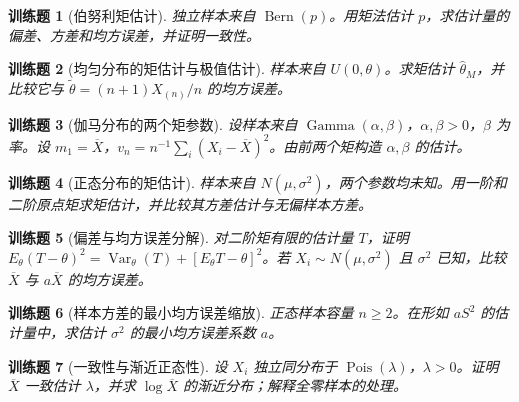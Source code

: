 \documentclass[UTF8,12pt,a4paper,fontset=fandol]{ctexbook}
\newtheorem{exercise}{训练题}[section]
\begin{document}
\begin{exercise}[伯努利矩估计]\label{q:B9.1}
独立样本来自 $\operatorname{Bern}(p)$。用矩法估计 $p$，求估计量的偏差、方差和均方误差，并证明一致性。\par{}\end{exercise}

\begin{exercise}[均匀分布的矩估计与极值估计]\label{q:B9.2}
样本来自 $U(0,\theta)$。求矩估计 $\widehat\theta_M$，并比较它与 $\widetilde\theta=(n+1)X_{(n)}/n$ 的均方误差。\par{}\end{exercise}

\begin{exercise}[伽马分布的两个矩参数]\label{q:B9.3}
设样本来自 $\operatorname{Gamma}(\alpha,\beta)$，$\alpha,\beta>0$，$\beta$ 为率。设 $m_1=\overline X$，$v_n=n^{-1}\sum_i(X_i-\overline X)^2$。由前两个矩构造 $\alpha,\beta$ 的估计。\par{}\end{exercise}

\begin{exercise}[正态分布的矩估计]\label{q:B9.4}
样本来自 $N(\mu,\sigma^2)$，两个参数均未知。用一阶和二阶原点矩求矩估计，并比较其方差估计与无偏样本方差。\par{}\end{exercise}

\begin{exercise}[偏差与均方误差分解]\label{q:B9.5}
对二阶矩有限的估计量 $T$，证明 $E_\theta(T-\theta)^2=\operatorname{Var}_\theta(T)+[E_\theta T-\theta]^2$。若 $X_i\sim N(\mu,\sigma^2)$ 且 $\sigma^2$ 已知，比较 $\overline X$ 与 $a\overline X$ 的均方误差。\par{}\end{exercise}

\begin{exercise}[样本方差的最小均方误差缩放]\label{q:B9.6}
正态样本容量 $n\ge2$。在形如 $aS^2$ 的估计量中，求估计 $\sigma^2$ 的最小均方误差系数 $a$。\par{}\end{exercise}

\begin{exercise}[一致性与渐近正态性]\label{q:B9.7}
设 $X_i$ 独立同分布于 $\operatorname{Pois}(\lambda)$，$\lambda>0$。证明 $\overline X$ 一致估计 $\lambda$，并求 $\log\overline X$ 的渐近分布；解释全零样本的处理。\par{}\end{exercise}
\end{document}

